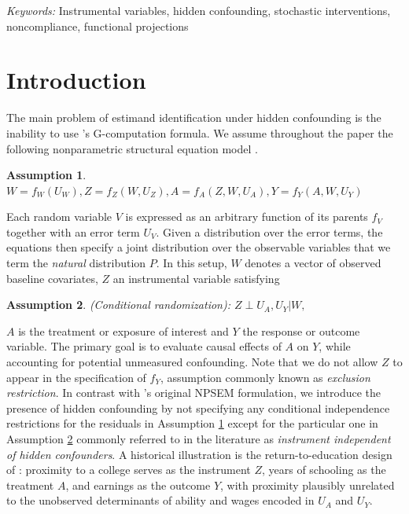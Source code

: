 \documentclass[12pt]{article}
\theoremstyle{thmstyleone}%
\theoremstyle{thmstyletwo}%
\theoremstyle{thmstylethree}%
\newtheorem{assumption}{Assumption}
\begin{document}
\noindent%
{\it Keywords:} Instrumental variables, hidden confounding, stochastic interventions, noncompliance, functional projections
\vfill

\newpage
{} %




\section{Introduction}

The main problem of estimand identification under hidden confounding is the inability to use \citet{robins1986new}'s G-computation formula.
We assume throughout the paper the following nonparametric structural equation model \citep[NPSEM,][]{pearl2000causality}. \begin{assumption}\label{ass:natsem} $W = f_W(U_W), Z = f_Z(W, U_Z), A = f_A(Z, W, U_A), Y = f_Y(A,W,U_Y) $\end{assumption}

Each random variable $V$ is expressed as an arbitrary function of its parents $f_V$ together with an error term $U_V$. Given a distribution over the error terms, the equations then specify a joint distribution over the observable variables that we term the \textit{natural} distribution $P$. In this setup, $W$ denotes a vector of observed baseline covariates, $Z$ an instrumental variable satisfying

\begin{assumption}\label{ipr}(Conditional randomization): $  Z \perp U_A, U_Y |W,$\end{assumption}



\noindent $A$ is the treatment or exposure of interest and $Y$ the response or outcome variable. The primary goal is to evaluate causal effects of $A$ on $Y$, while accounting for potential unmeasured confounding.  {Note that we do not allow $Z$ to appear in the specification of $f_Y$, assumption commonly known as \textit{exclusion restriction}.} In contrast with \citet{pearl2000causality}'s original NPSEM formulation, we introduce the presence of hidden confounding by not specifying any conditional independence restrictions for the residuals in Assumption \ref{ass:natsem} except for the particular one in Assumption \ref{ipr} commonly referred to in the literature as \textit{instrument independent of hidden confounders}. A historical illustration is the return-to-education design of \citet{card1995using}: proximity to a college serves as the instrument $Z$, years of schooling as the treatment $A$, and earnings as the outcome $Y$, with proximity plausibly unrelated to the unobserved determinants of ability and wages encoded in $U_A$ and $U_Y$.
\end{document}
